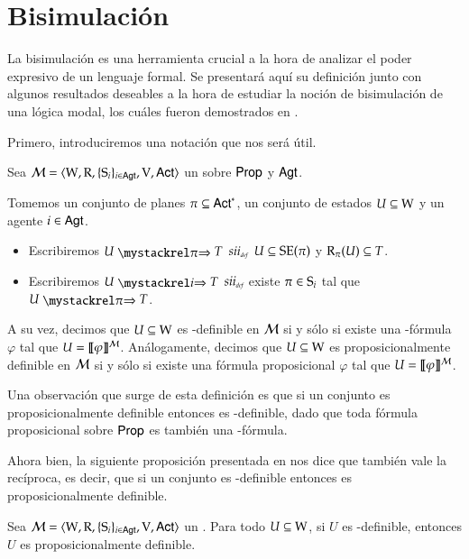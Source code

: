 \section{Bisimulación}

La bisimulación es una herramienta crucial a la hora de analizar el poder expresivo de un lenguaje formal. Se presentará aquí su definición junto con algunos resultados 
deseables a la hora de estudiar la noción de bisimulación de una lógica modal, los cuáles fueron demostrados en \cite{ArecesFSV25}.

Primero, introduciremos una notación que nos será útil.

\begin{definicion}
    Sea $\model=\tup{\W,\R,\cset{\S_i}_{i \in \AGT},\V,\ACT}$ un \ults sobre $\PROP$ y $\AGT$.

    Tomemos un conjunto de planes $\pi \subseteq \ACT^*$, un conjunto de estados $U \subseteq \W$ y un agente $i \in \AGT$.
    \begin{itemize}
        \item Escribiremos $U \ultsExecStrat{\pi} T$ $\iffdef$ $U \subseteq \sexec(\pi)$ y $\R_\pi(U) \subseteq T$.
        \item Escribiremos $U \ultsExecAgi T$ $\iffdef$ existe $\pi \in \S_i$ tal que $U \ultsExecStrat{\pi} T$.
    \end{itemize}
    A su vez, decimos que $U \subseteq \W$ es \KHilogic-definible en $\modults$ si y sólo si existe una \KHilogic-fórmula $\varphi$ tal que
    $U = \truthset{\modults}{\varphi}$. Análogamente, decimos que $U \subseteq \W$ es proposicionalmente definible en $\modults$ 
    si y sólo si existe una fórmula proposicional $\varphi$ tal que $U = \truthset{\modults}{\varphi}$.
\end{definicion}

Una observación que surge de esta definición es que si un conjunto es proposicionalmente definible entonces es \KHilogic-definible, dado que 
toda fórmula proposicional sobre $\PROP$ es también una \KHilogic-fórmula.

Ahora bien, la siguiente proposición presentada en \cite{ArecesFSV25} nos dice que también vale la recíproca, 
es decir, que si un conjunto es \KHilogic-definible entonces es proposicionalmente definible.

\begin{proposicion}\label{prop:khi_definable-implies-propositionally_definable}
    Sea $\model=\tup{\W,\R,\cset{\S_i}_{i \in \AGT},\V,\ACT}$ un \ults. Para todo $U \subseteq \W$, si $U$ es \KHilogic-definible, entonces $U$ es proposicionalmente definible.
\end{proposicion}

